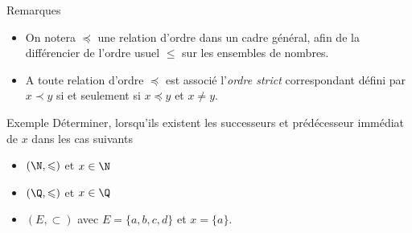 \documentclass[10pt]{beamer}
\begin{document}
\begin{frame}[fragile]{\Ctitle}{\stitle}
    \begin{block}{Remarques}
        \begin{itemize}
            \item<1-> On notera $\preccurlyeq$ une relation d'ordre dans un cadre général, afin de la différencier de l'ordre usuel  $\leqslant$ sur les ensembles de nombres.
            \item<2-> A toute relation d'ordre $\preccurlyeq$ est associé l'\textit{ordre strict} correspondant défini par $x \prec y$ si et seulement si $x \preccurlyeq y$ et $x \neq y$.
        \end{itemize}
    \end{block}
\end{frame}

\begin{frame}{\Ctitle}{\stitle}
    \begin{exampleblock}{Exemple}
        Déterminer, lorsqu'ils existent les successeurs et prédécesseur immédiat de $x$ dans les cas suivants
        \begin{itemize}
            \item<1-> $(\N, \leqslant)$ et $x \in \N$
            \item<2-> $(\Q, \leqslant)$ et $x \in \Q$
            \item<3-> $(E, \subset)$ avec $E = \{a, b, c, d\}$ et $x = \{a\}$.
        \end{itemize}
    \end{exampleblock}
\end{frame}
\end{document}
